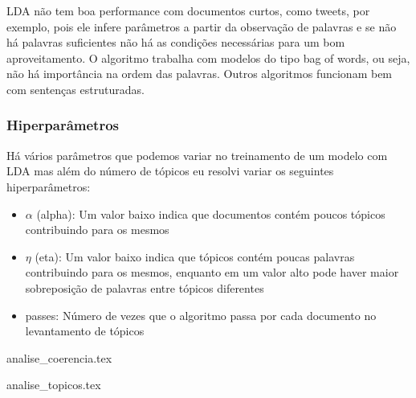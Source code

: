 LDA não tem boa performance com documentos curtos, como tweets, por exemplo, pois ele infere parâmetros a partir da observação de palavras e se não há palavras
suficientes não há as condições necessárias para um bom aproveitamento. O algoritmo trabalha com modelos do tipo bag of words, ou seja, 
não há importância na ordem das palavras. Outros algoritmos funcionam bem com sentenças estruturadas.

\subsubsection{Hiperparâmetros}

Há vários parâmetros que podemos variar no treinamento de um modelo com LDA mas além do número de tópicos eu resolvi variar os seguintes hiperparâmetros:

\begin{itemize}
    \item $\alpha$ (alpha): Um valor baixo indica que documentos contém poucos tópicos contribuindo para os mesmos
    \item $\eta$ (eta): Um valor baixo indica que tópicos contém poucas palavras contribuindo para os mesmos, enquanto em um valor alto pode haver maior sobreposição 
    de palavras entre tópicos diferentes
    \item passes: Número de vezes que o algoritmo passa por cada documento no levantamento de tópicos
\end{itemize}

{analise_coerencia.tex}

{analise_topicos.tex}